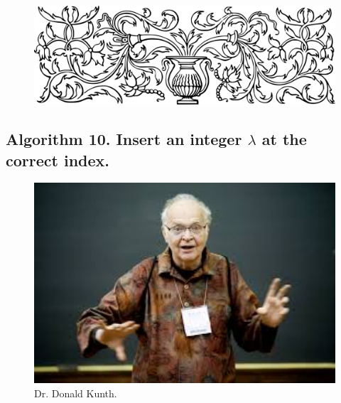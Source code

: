 \documentclass[preview]{standalone}
\begin{document}
\begin{figure}[!h]
    \centering
    \includegraphics[width=14cm]{../resources/jpg/3.1.algorithms/border1.png}
\end{figure}
\subsection[Insert an integer into a list.]{
    \color{section} Algorithm 10. \color{black} Insert an integer $\lambda$ at the correct index.
}
\vspace{-1\baselineskip}

\vspace{1\baselineskip}
\begin{center}
    
\end{center}
\pagebreak
\begin{center}
    
\end{center}
\vspace{1.5\baselineskip}
\begin{figure}[!h]
    \centering
    \includegraphics[width=14cm]{../resources/jpg/3.1.algorithms/kunth.jpg}
    \caption*{Dr. Donald Kunth.}
\end{figure}
\end{document}
